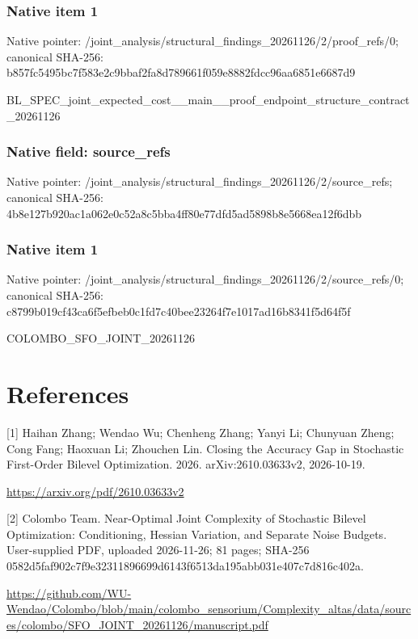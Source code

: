 \documentclass[10pt,a4paper]{article}
\begin{document}
\subsubsection{Native item 1}


Native pointer: /joint\_analysis/structur\allowbreak{}al\_findings\_20261126/2/p\allowbreak{}roof\_refs/0; canonical SHA-256: b857fc5495bc7f583e2c9bba\allowbreak{}f2fa8d789661f059e8882fdc\allowbreak{}c96aa6851e6687d9


BL\_SPEC\_joint\_expected\_c\allowbreak{}ost\_\_main\_\_proof\_endpoin\allowbreak{}t\_structure\_contract\_202\allowbreak{}61126


\subsubsection{Native field: source\_refs}


Native pointer: /joint\_analysis/structur\allowbreak{}al\_findings\_20261126/2/s\allowbreak{}ource\_refs; canonical SHA-256: 4b8e127b920ac1a062e0c52a\allowbreak{}8c5bba4ff80e77dfd5ad5898\allowbreak{}b8e5668ea12f6dbb



\subsubsection{Native item 1}


Native pointer: /joint\_analysis/structur\allowbreak{}al\_findings\_20261126/2/s\allowbreak{}ource\_refs/0; canonical SHA-256: c8799b019cf43ca6f5efbeb0\allowbreak{}c1fd7c40bee23264f7e1017a\allowbreak{}d16b8341f5d64f5f


COLOMBO\_SFO\_JOINT\_20261126


\section{References}


[1] Haihan Zhang; Wendao Wu; Chenheng Zhang; Yanyi Li; Chunyuan Zheng; Cong Fang; Haoxuan Li; Zhouchen Lin. Closing the Accuracy Gap in Stochastic First-Order Bilevel Optimization. 2026. arXiv:2610.03633v2, 2026-10-19.



\url{https://arxiv.org/pdf/2610.03633v2}



[2] Colombo Team. Near-Optimal Joint Complexity of Stochastic Bilevel Optimization: Conditioning, Hessian Variation, and Separate Noise Budgets. User-supplied PDF, uploaded 2026-11-26; 81 pages; SHA-256 0582d5faf902c7f9e3231189\allowbreak{}6699d6143f6513da195abb03\allowbreak{}1e407c7d816c402a.



\url{https://github.com/WU-Wendao/Colombo/blob/main/colombo_sensorium/Complexity_altas/data/sources/colombo/SFO_JOINT_20261126/manuscript.pdf}
\end{document}

